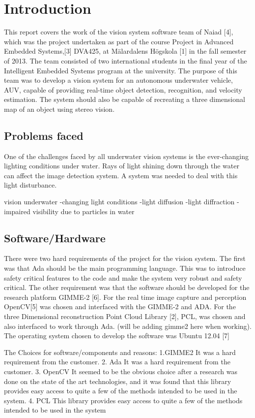 \section{Introduction}\label{sec:introduction}
This report covers the work of the vision system software team of Naiad [4], which was the project undertaken as part of the course Project in Advanced Embedded Systems,[3] DVA425, at Mälardalens Högskola [1] in the fall semester of 2013. The team consisted of two international students in the final year of the Intelligent Embedded Systems program at the university.
The purpose of this team was to develop a vision system for an autonomous underwater vehicle, AUV, capable of providing real-time object detection, recognition, and velocity estimation. The system should also be capable of recreating a three dimensional map of an object using stereo vision.

\subsection{Problems faced}
One of the challenges faced by all underwater vision systems is the ever-changing lighting conditions under water. Rays of light shining down through the water can affect the image detection system. A system was needed to deal with this light disturbance.

vision underwater
-changing light conditions
-light diffusion
-light diffraction
-impaired visibility due to particles in water


\subsection{Software/Hardware}
There were two hard requirements of the project for the vision system. The first was that Ada should be the main programming language. This was to introduce safety critical features to the code and make the system very robust and safety critical. The other requirement was that the software should be developed for the research platform GIMME-2 [6]. 
For the real time image capture and perception OpenCV[5] was chosen and interfaced with the GIMME-2 and ADA. For the three Dimensional reconstruction Point Cloud Library [2], PCL, was chosen and also interfaced to work through Ada. (will be adding gimme2 here when working). The operating system chosen to develop the software was Ubuntu 12.04 [7]

The Choices for software/components and reasons:
1.GIMME2
    It was a hard requirement from the customer.
2. Ada
    It was a hard requirement from the customer.
3. OpenCV
    It seemed to be the obvious choice after a research was done on the state of the art technologies, and it was found that this library provides easy access to quite a few of the methods intended to be used in the system.
4. PCL
This library provides easy access to quite a few of the methods intended to be used in the system



